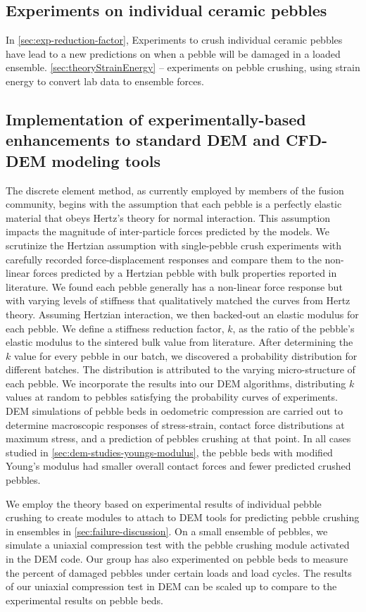 \subsection*{Experiments on individual ceramic pebbles}
In \cref{sec:exp-reduction-factor}, Experiments to crush individual ceramic pebbles have lead to a new predictions on when a pebble will be damaged in a loaded ensemble. \cref{sec:theoryStrainEnergy} -- experiments on pebble crushing, using strain energy to convert lab data to ensemble forces.

\subsection*{Implementation of experimentally-based enhancements to standard DEM and CFD-DEM modeling tools}
The discrete element method, as currently employed by members of the fusion community, begins with the assumption that each pebble is a perfectly elastic material that obeys Hertz’s theory for normal interaction. This assumption impacts the magnitude of inter-particle forces predicted by the models. We scrutinize the Hertzian assumption with single-pebble crush experiments with carefully recorded force-displacement responses and compare them to the non-linear forces predicted by a Hertzian pebble with bulk properties reported in literature. We found each pebble generally has a non-linear force response but with varying levels of stiffness that qualitatively matched the curves from Hertz theory. Assuming Hertzian interaction, we then backed-out an elastic modulus for each pebble. We define a stiffness reduction factor, $k$, as the ratio of the pebble's elastic modulus to the sintered bulk value from literature. After determining the $k$ value for every pebble in our batch, we discovered a probability distribution for different batches. The distribution is attributed to the varying micro-structure of each pebble. We incorporate the results into our DEM algorithms, distributing $k$ values at random to pebbles satisfying the probability curves of experiments. DEM simulations of pebble beds in oedometric compression are carried out to determine macroscopic responses of stress-strain, contact force distributions at maximum stress, and a prediction of pebbles crushing at that point. In all cases studied in \cref{sec:dem-studies-youngs-modulus}, the pebble beds with modified Young's modulus had smaller overall contact forces and fewer predicted crushed pebbles. 

We employ the theory based on experimental results of individual pebble crushing to create modules to attach to DEM tools for predicting pebble crushing in ensembles in \cref{sec:failure-discussion}. On a small ensemble of pebbles, we simulate a uniaxial compression test with the pebble crushing module activated in the DEM code. Our group has also experimented on pebble beds to measure the percent of damaged pebbles under certain loads and load cycles. The results of our uniaxial compression test in DEM can be scaled up to compare to the experimental results on pebble beds.

